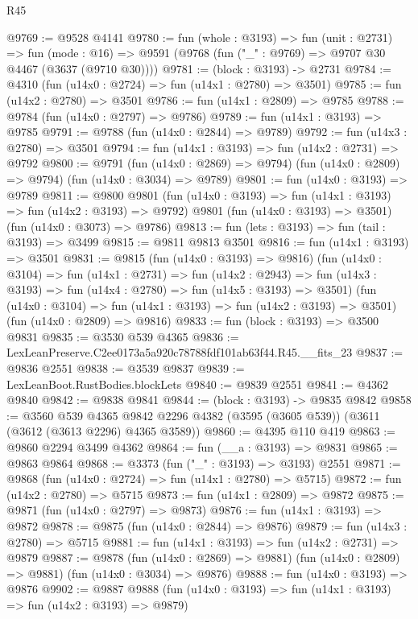 \begin{lexlean}{R45}
\begin{coremodule}
@9769 := @9528 @4141
@9780 := fun (whole : @3193) =>
  fun (unit : @2731) =>
  fun (mode : @16) => @9591 (@9768 (fun ("_" : @9769) => @9707 @30 @4467 (@3637 (@9710 @30))))
@9781 := (block : @3193) -> @2731
@9784 := @4310 (fun (u14x0 : @2724) => fun (u14x1 : @2780) => @3501)
@9785 := fun (u14x2 : @2780) => @3501
@9786 := fun (u14x1 : @2809) => @9785
@9788 := @9784 (fun (u14x0 : @2797) => @9786)
@9789 := fun (u14x1 : @3193) => @9785
@9791 := @9788 (fun (u14x0 : @2844) => @9789)
@9792 := fun (u14x3 : @2780) => @3501
@9794 := fun (u14x1 : @3193) => fun (u14x2 : @2731) => @9792
@9800 := @9791
    (fun (u14x0 : @2869) => @9794)
    (fun (u14x0 : @2809) => @9794)
    (fun (u14x0 : @3034) => @9789)
@9801 := fun (u14x0 : @3193) => @9789
@9811 := @9800
    @9801
    (fun (u14x0 : @3193) => fun (u14x1 : @3193) => fun (u14x2 : @3193) => @9792)
    @9801
    (fun (u14x0 : @3193) => @3501)
    (fun (u14x0 : @3073) => @9786)
@9813 := fun (lets : @3193) => fun (tail : @3193) => @3499
@9815 := @9811 @9813 @3501
@9816 := fun (u14x1 : @3193) => @3501
@9831 := @9815
    (fun (u14x0 : @3193) => @9816)
    (fun (u14x0 : @3104) =>
    fun (u14x1 : @2731) =>
    fun (u14x2 : @2943) =>
    fun (u14x3 : @3193) => fun (u14x4 : @2780) => fun (u14x5 : @3193) => @3501)
    (fun (u14x0 : @3104) => fun (u14x1 : @3193) => fun (u14x2 : @3193) => @3501)
    (fun (u14x0 : @2809) => @9816)
@9833 := fun (block : @3193) => @3500 @9831
@9835 := @3530 @539 @4365
@9836 := LexLeanPreserve.C2ee0173a5a920c78788fdf101ab63f44.R45.__fits_23
@9837 := @9836 @2551
@9838 := @3539 @9837
@9839 := LexLeanBoot.RustBodies.blockLets
@9840 := @9839 @2551
@9841 := @4362 @9840
@9842 := @9838 @9841
@9844 := (block : @3193) -> @9835 @9842
@9858 := @3560
    @539
    @4365
    @9842
    @2296
    @4382
    (@3595 (@3605 @539))
    (@3611 (@3612 (@3613 @2296) @4365 @3589))
@9860 := @4395 @110 @419
@9863 := @9860 @2294 @3499 @4362
@9864 := fun (__a : @3193) => @9831
@9865 := @9863 @9864
@9868 := @3373 (fun ("_" : @3193) => @3193) @2551
@9871 := @9868 (fun (u14x0 : @2724) => fun (u14x1 : @2780) => @5715)
@9872 := fun (u14x2 : @2780) => @5715
@9873 := fun (u14x1 : @2809) => @9872
@9875 := @9871 (fun (u14x0 : @2797) => @9873)
@9876 := fun (u14x1 : @3193) => @9872
@9878 := @9875 (fun (u14x0 : @2844) => @9876)
@9879 := fun (u14x3 : @2780) => @5715
@9881 := fun (u14x1 : @3193) => fun (u14x2 : @2731) => @9879
@9887 := @9878
    (fun (u14x0 : @2869) => @9881)
    (fun (u14x0 : @2809) => @9881)
    (fun (u14x0 : @3034) => @9876)
@9888 := fun (u14x0 : @3193) => @9876
@9902 := @9887
    @9888
    (fun (u14x0 : @3193) => fun (u14x1 : @3193) => fun (u14x2 : @3193) => @9879)

\end{coremodule}
\end{lexlean}
